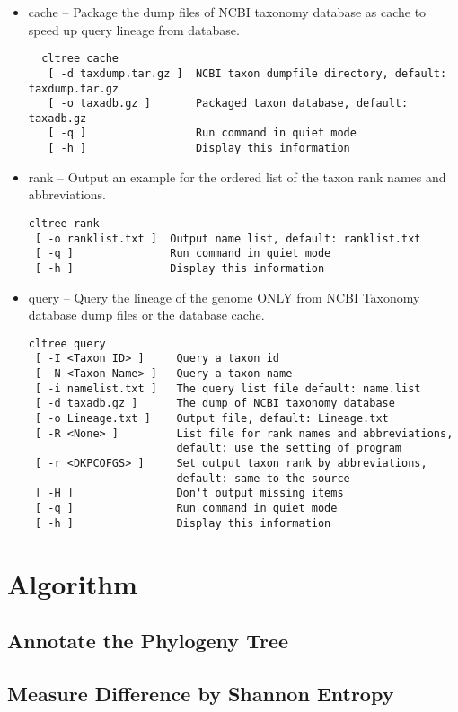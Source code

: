 \documentclass[12pt,a4paper]{article}
\begin{document}
\begin{itemize}
\item cache -- Package the dump files of NCBI taxonomy database as cache to speed up query lineage from database.
  \begin{verbatim}
  cltree cache
   [ -d taxdump.tar.gz ]  NCBI taxon dumpfile directory, default: taxdump.tar.gz
   [ -o taxadb.gz ]       Packaged taxon database, default: taxadb.gz
   [ -q ]                 Run command in quiet mode
   [ -h ]                 Display this information
  \end{verbatim}

\item rank -- Output an example for the ordered list of the taxon rank names and abbreviations.
\begin{verbatim}
cltree rank
 [ -o ranklist.txt ]  Output name list, default: ranklist.txt
 [ -q ]               Run command in quiet mode
 [ -h ]               Display this information
\end{verbatim}

\item query -- Query the lineage of the genome ONLY from NCBI Taxonomy database dump files or the database cache.
\begin{verbatim}
cltree query
 [ -I <Taxon ID> ]     Query a taxon id
 [ -N <Taxon Name> ]   Query a taxon name
 [ -i namelist.txt ]   The query list file default: name.list
 [ -d taxadb.gz ]      The dump of NCBI taxonomy database
 [ -o Lineage.txt ]    Output file, default: Lineage.txt
 [ -R <None> ]         List file for rank names and abbreviations,
                       default: use the setting of program
 [ -r <DKPCOFGS> ]     Set output taxon rank by abbreviations,
                       default: same to the source
 [ -H ]                Don't output missing items
 [ -q ]                Run command in quiet mode
 [ -h ]                Display this information
\end{verbatim}
\end{itemize}

\section{Algorithm}

\subsection{Annotate the Phylogeny Tree}
	
\subsection{Measure Difference by Shannon Entropy}
\end{document}
